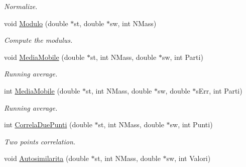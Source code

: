 \begin{DoxyCompactItemize}
\begin{DoxyCompactList}\small\item\em \-Normalize. \end{DoxyCompactList}\item 
\hypertarget{classMatematica_a4e641eb6229cee6b8fb5674433fc2da5}{void \hyperlink{classMatematica_a4e641eb6229cee6b8fb5674433fc2da5}{\-Modulo} (double $\ast$st, double $\ast$sw, int \-N\-Mass)}\label{classMatematica_a4e641eb6229cee6b8fb5674433fc2da5}

\begin{DoxyCompactList}\small\item\em \-Compute the modulus. \end{DoxyCompactList}\item 
\hypertarget{classMatematica_a99d5aa828752a12f2c5bc2033e00d0ad}{void \hyperlink{classMatematica_a99d5aa828752a12f2c5bc2033e00d0ad}{\-Media\-Mobile} (double $\ast$st, int \-N\-Mass, double $\ast$sw, int \-Parti)}\label{classMatematica_a99d5aa828752a12f2c5bc2033e00d0ad}

\begin{DoxyCompactList}\small\item\em \-Running average. \end{DoxyCompactList}\item 
\hypertarget{classMatematica_a0529a1c2450d94429ff81273ce35cd42}{int \hyperlink{classMatematica_a0529a1c2450d94429ff81273ce35cd42}{\-Media\-Mobile} (double $\ast$st, int \-N\-Mass, double $\ast$sw, double $\ast$s\-Err, int \-Parti)}\label{classMatematica_a0529a1c2450d94429ff81273ce35cd42}

\begin{DoxyCompactList}\small\item\em \-Running average. \end{DoxyCompactList}\item 
\hypertarget{classMatematica_acc472956dae6f7628bad8d4ca7f7ed68}{int \hyperlink{classMatematica_acc472956dae6f7628bad8d4ca7f7ed68}{\-Correla\-Due\-Punti} (double $\ast$st, int \-N\-Mass, double $\ast$sw, int \-Punti)}\label{classMatematica_acc472956dae6f7628bad8d4ca7f7ed68}

\begin{DoxyCompactList}\small\item\em \-Two points correlation. \end{DoxyCompactList}\item 
\hypertarget{classMatematica_ac6fad3beb60e7a8d3b35e40a1eb98fb3}{void \hyperlink{classMatematica_ac6fad3beb60e7a8d3b35e40a1eb98fb3}{\-Autosimilarita} (double $\ast$st, int \-N\-Mass, double $\ast$sw, int \-Valori)}\label{classMatematica_ac6fad3beb60e7a8d3b35e40a1eb98fb3}


\end{DoxyCompactItemize}
